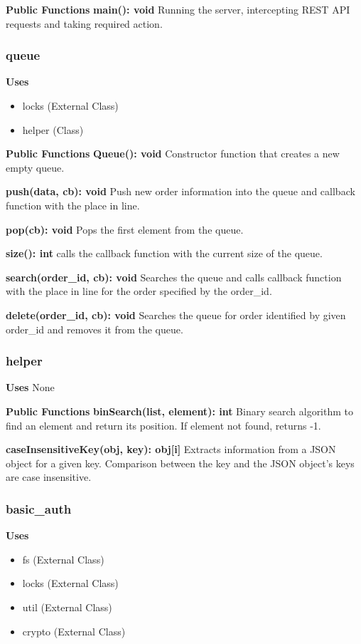 \documentclass [10pt]{article}
\begin{document}
\textbf{Public Functions}
\textbf{main(): void}
Running the server, intercepting REST API requests and taking required action.


\subsubsection{queue}
\textbf{Uses}
\begin{itemize}
	\item locks (External Class)
	\item helper (Class)
\end{itemize}

\textbf{Public Functions}
\textbf{Queue(): void}
Constructor function that creates a new empty queue.

\textbf{push(data, cb): void}
Push new order information into the queue and callback function with the place in line.

\textbf{pop(cb): void}
Pops the first element from the queue.

\textbf{size(): int}
calls the callback function with the current size of the queue.

\textbf{search(order\_id, cb): void}
Searches the queue and calls callback function with the place in line for the order specified by the order\_id.

\textbf{delete(order\_id, cb): void}
Searches the queue for order identified by given order\_id and removes it from the queue.


\subsubsection{helper}
\textbf{Uses}
None

\textbf{Public Functions}
\textbf{binSearch(list, element): int}
Binary search algorithm to find an element and return its position. If element not found, returns -1.

\textbf{caseInsensitiveKey(obj, key): obj[i]}
Extracts information from a JSON object for a given key. Comparison between the key and the JSON object's keys are case insensitive.


\subsubsection{basic\_auth}
\textbf{Uses}
\begin{itemize}
	\item fs (External Class)
	\item locks (External Class)
	\item util (External Class)
	\item crypto (External Class)
\end{itemize}
\end{document}
